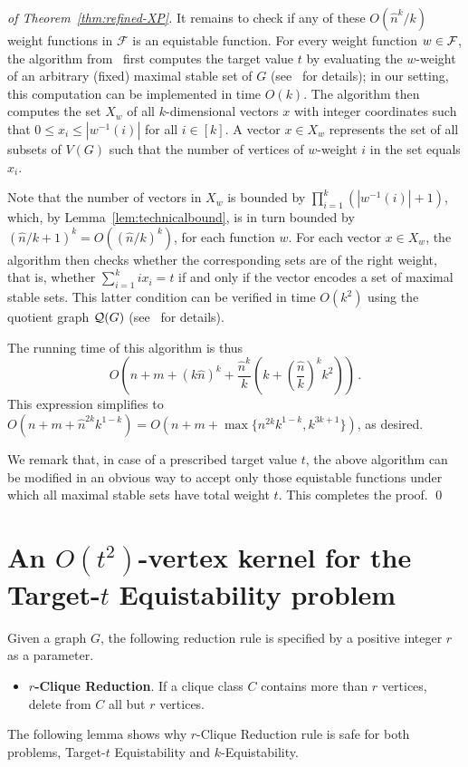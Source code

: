 \documentclass{llncs}
\begin{document}
\begin{proof}[of Theorem~\ref{thm:refined-XP}]
It remains to check if any of these $O(\hat{n}^k/k)$ weight functions in $\mathcal{F}$ is an equistable function.
For every weight function $w\in {\cal F}$, the algorithm from~\cite{MR3040147} first computes the target value $t$
by evaluating the $w$-weight of an arbitrary (fixed) maximal stable set of $G$ (see~\cite{MR3040147} for details);
in our setting, this computation can be implemented in time $O(k)$.
The algorithm then computes the set $X_w$ of all $k$-dimensional vectors $x$ with integer coordinates such that
$0\le x_i\le |w^{-1}(i)|$ for all $i\in [k]$. A vector $x\in X_w$ represents the set of all subsets of $V(G)$ such that
the number of vertices of $w$-weight $i$ in the set equals $x_i$.

Note that the number of vectors in $X_w$ is bounded by $\prod_{i=1}^k (|w^{-1}(i)|+1)$, which, by Lemma~\ref{lem:technicalbound},
is in turn bounded by $(\hat{n}/k+1)^k=O((\hat{n}/k)^k)$, for each function $w$. For each vector $x\in X_w$, the algorithm then checks whether the corresponding sets are of the right weight, that is, whether $\sum_{i = 1}^k ix_i = t$ if  and only if the vector encodes a set of maximal stable sets. This latter condition can be verified in time $O(k^2)$ using the quotient graph ${\cal Q}(G)$ (see~\cite{MR3040147} for details).

\begin{sloppypar}
The running time of this algorithm is thus
\[O \left( n + m + (k\hat n)^k + \frac{\hat{n}^k}{k}\left(k+\left(\frac{\hat{n}}{k}\right)^kk^2\right)\right)\,.\]
This expression simplifies to $O(n+m+\hat{n}^{2k}{k^{1-k}}) =
O(n+m+\max\{n^{2k}k^{1-k},k^{3k+1}\})$, as desired.
\end{sloppypar}

We remark that, in case of a prescribed target value $t$, the above algorithm can be modified in an obvious way to accept only those equistable functions under which all maximal stable sets have total weight $t$. This completes the proof.
\qed \end{proof}


\section{An $O(t^2)$-vertex kernel for the {\sc Target-$t$ Equistability} problem}\label{sec:t-equi}

Given a graph $G$, the following reduction rule is specified by a positive integer $r$ as a parameter.

\begin{itemize}
  \item[] {\bf $r$-Clique Reduction}. If a clique class $C$ contains more than $r$ vertices, delete from $C$ all but $r$ vertices.
\end{itemize}
The following lemma shows why $r$-Clique Reduction rule is safe for both problems, {\sc Target-$t$ Equistability} and {\sc $k$-Equistability}.
\end{document}
